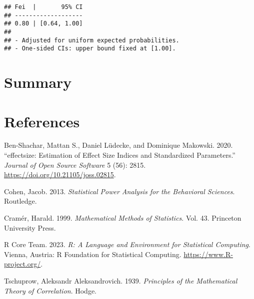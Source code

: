 \documentclass[
]{article}
\newlength{\cslhangindent}
\newlength{\cslentryspacingunit} %
\newenvironment{CSLReferences}[2] %
 {%
  \setlength{\parindent}{0pt}
  \ifodd #1
  \let\oldpar\par
  \def\par{\hangindent=\cslhangindent\oldpar}
  \fi
  \setlength{\parskip}{#2\cslentryspacingunit}
 }%
 {}
\begin{document}
\begin{verbatim}
## Fei  |       95% CI
## -------------------
## 0.80 | [0.64, 1.00]
## 
## - Adjusted for uniform expected probabilities.
## - One-sided CIs: upper bound fixed at [1.00].
\end{verbatim}

\hypertarget{summary}{%
\section{Summary}\label{summary}}

\hypertarget{references}{%
\section*{References}\label{references}}

\hypertarget{refs}{}
\begin{CSLReferences}{1}{0}
\leavevmode{}%
Ben-Shachar, Mattan S., Daniel Lüdecke, and Dominique Makowski. 2020.
{``{e}ffectsize: Estimation of Effect Size Indices and Standardized
Parameters.''} \emph{Journal of Open Source Software} 5 (56): 2815.
\url{https://doi.org/10.21105/joss.02815}.

\leavevmode{}%
Cohen, Jacob. 2013. \emph{Statistical Power Analysis for the Behavioral
Sciences}. Routledge.

\leavevmode{}%
Cramér, Harald. 1999. \emph{Mathematical Methods of Statistics}. Vol.
43. Princeton University Press.

\leavevmode{}%
R Core Team. 2023. \emph{R: A Language and Environment for Statistical
Computing}. Vienna, Austria: R Foundation for Statistical Computing.
\url{https://www.R-project.org/}.

\leavevmode{}%
Tschuprow, Aleksandr Aleksandrovich. 1939. \emph{Principles of the
Mathematical Theory of Correlation}. Hodge.

\end{CSLReferences}
\end{document}
